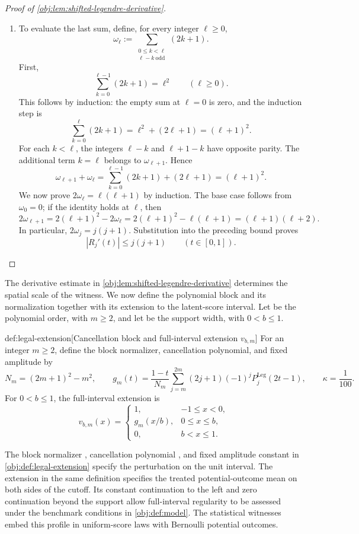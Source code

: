 \documentclass[11pt]{article}
\begin{document}
\begin{proof}[Proof of \cref{obj:lem:shifted-legendre-derivative}]
\begin{enumerate}
\item To evaluate the last sum, define, for every integer \(\ell\ge0\),
\[
\omega_\ell:=
\sum_{\substack{0\le k<\ell\\\ell-k\ \mathrm{odd}}}(2k+1).
\]
First,
\[
\sum_{k=0}^{\ell-1}(2k+1)=\ell^2
\qquad(\ell\ge0).
\]
This follows by induction: the empty sum at \(\ell=0\) is zero, and the induction step is
\[
\sum_{k=0}^{\ell}(2k+1)
=\ell^2+(2\ell+1)=(\ell+1)^2.
\]
For each \(k<\ell\), the integers \(\ell-k\) and \(\ell+1-k\) have opposite parity. The additional term \(k=\ell\) belongs to \(\omega_{\ell+1}\). Hence
\[
\omega_{\ell+1}+\omega_\ell
=
\sum_{k=0}^{\ell-1}(2k+1)+(2\ell+1)
=(\ell+1)^2.
\]
We now prove \(2\omega_\ell=\ell(\ell+1)\) by induction. The base case follows from \(\omega_0=0\); if the identity holds at \(\ell\), then
\[
2\omega_{\ell+1}
=2(\ell+1)^2-2\omega_\ell
=2(\ell+1)^2-\ell(\ell+1)
=(\ell+1)(\ell+2).
\]
In particular, \(2\omega_j=j(j+1)\). Substitution into the preceding bound proves
\[
|R_j'(t)|\le j(j+1)
\qquad(t\in[0,1]).
\]
\end{enumerate}
\end{proof}

The derivative estimate in \cref{obj:lem:shifted-legendre-derivative} determines the spatial scale of the witness. We now define the polynomial block and its normalization together with its extension to the latent-score interval. Let  be the polynomial order, with \(m\ge2\), and let  be the support width, with \(0<b\le1\).

\begin{definitionv}{def:legal-extension}[Cancellation block and full-interval extension $v_{b,m}$]
For an integer \(m\ge2\), define the block normalizer, cancellation polynomial, and fixed amplitude by
\[
N_m=(2m+1)^2-m^2,
\qquad
g_m(t)=\frac{1-t}{N_m}
\sum_{j=m}^{2m}(2j+1)(-1)^jP_j^{\mathrm{Leg}}(2t-1),
\qquad
\kappa=\frac1{100}.
\]
For \(0<b\le1\), the full-interval extension is
\[
v_{b,m}(x)
=
\begin{cases}
1, & -1\le x<0,\\
g_m(x/b), & 0\le x\le b,\\
0, & b<x\le1.
\end{cases}
\]
\end{definitionv}

The block normalizer , cancellation polynomial , and fixed amplitude constant  in \cref{obj:def:legal-extension} specify the perturbation on the unit interval. The extension  in the same definition specifies the treated potential-outcome mean on both sides of the cutoff. Its constant continuation to the left and zero continuation beyond the support allow full-interval regularity to be assessed under the benchmark conditions in \cref{obj:def:model}. The statistical witnesses embed this profile in uniform-score laws with Bernoulli potential outcomes.
\end{document}
